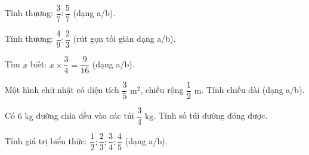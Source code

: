 \begin{ex} %
Tính thương: $\dfrac{3}{7} : \dfrac{5}{7}$ (dạng a/b).
\end{ex}

\begin{ex} %
Tính thương: $\dfrac{4}{9} : \dfrac{2}{3}$ (rút gọn tối giản dạng a/b).
\end{ex}

\begin{ex} %
Tìm $x$ biết: $x \times \dfrac{3}{4} = \dfrac{9}{16}$ (dạng a/b).
\end{ex}

\begin{ex} %
Một hình chữ nhật có diện tích $\dfrac{3}{5}\text{ m}^2$, chiều rộng $\dfrac{1}{2}\text{ m}$. Tính chiều dài (dạng a/b).
\end{ex}

\begin{ex} %
Có $6\text{ kg}$ đường chia đều vào các túi $\dfrac{3}{4}\text{ kg}$. Tính số túi đường đóng được.
\end{ex}

\begin{ex} %
Tính giá trị biểu thức: $\dfrac{1}{2} : \dfrac{2}{3} : \dfrac{3}{4} : \dfrac{4}{5}$ (dạng a/b).
\end{ex}
